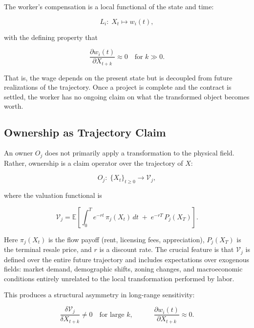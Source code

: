 \documentclass[12pt]{article}
\begin{document}
The worker's compensation is a local functional of the state and time:

\begin{equation}
L_i:\; X_t \longmapsto w_i(t),
\end{equation}

with the defining property that

\begin{equation}
\frac{\partial w_i(t)}{\partial X_{t+k}} \approx 0 \quad \text{for } k \gg 0.
\end{equation}

That is, the wage depends on the present state but is decoupled from future realizations of the trajectory. Once a project is complete and the contract is settled, the worker has no ongoing claim on what the transformed object becomes worth.

\subsection{Ownership as Trajectory Claim}

An owner $O_j$ does not primarily apply a transformation to the physical field. Rather, ownership is a claim operator over the trajectory of $X$:

\begin{equation}
O_j:\; \{X_t\}_{t \ge 0} \longrightarrow \mathcal{V}_j,
\end{equation}

where the valuation functional is

\begin{equation}
\mathcal{V}_j = \mathbb{E}\!\left[\int_0^T e^{-rt}\, \pi_j(X_t)\, dt \;+\; e^{-rT}\, P_j(X_T)\right].
\end{equation}

Here $\pi_j(X_t)$ is the flow payoff (rent, licensing fees, appreciation), $P_j(X_T)$ is the terminal resale price, and $r$ is a discount rate. The crucial feature is that $\mathcal{V}_j$ is defined over the entire future trajectory and includes expectations over exogenous fields: market demand, demographic shifts, zoning changes, and macroeconomic conditions entirely unrelated to the local transformation performed by labor.

This produces a structural asymmetry in long-range sensitivity:

\begin{equation}
\frac{\delta \mathcal{V}_j}{\delta X_{t+k}} \neq 0 \quad \text{for large } k,
\qquad\quad
\frac{\partial w_i(t)}{\partial X_{t+k}} \approx 0.
\end{equation}
\end{document}
